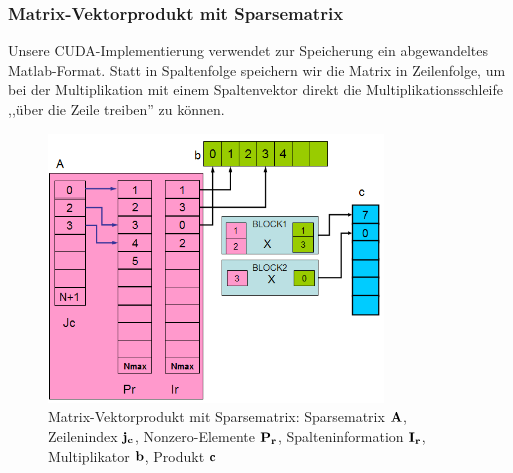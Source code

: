 
\subsubsection{Matrix-Vektorprodukt mit Sparsematrix}





Unsere CUDA-Implementierung verwendet zur Speicherung ein abgewandeltes
Matlab-Format. Statt in Spaltenfolge speichern wir die Matrix
in Zeilenfolge, um bei der Multiplikation mit einem Spaltenvektor direkt
die Multiplikationsschleife ,,über die Zeile treiben'' zu können.

\begin{figure}[htbp]
\includegraphics[width=3.5in]{../xby/pic/sparseMul}
\caption{Matrix-Vektorprodukt mit Sparsematrix: Sparsematrix $\bf A $, Zeilenindex $ \bf j_c$, Nonzero-Elemente $\bf P_r$,  Spalteninformation $ \bf I_r$, Multiplikator $\bf b$, Produkt $\bf c$}
\label{sparseMul}
\end{figure}